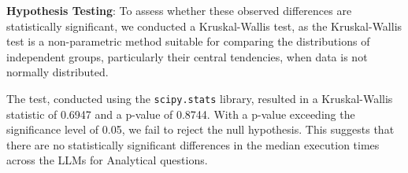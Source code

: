 \documentclass[conference]{IEEEtran}
\begin{document}

\textbf{Hypothesis Testing}: To assess whether these observed differences are statistically significant, we conducted a Kruskal-Wallis test, as the Kruskal-Wallis test is a non-parametric method suitable for comparing the distributions of independent groups, particularly their central tendencies, when data is not normally distributed. %


The test, conducted using the \texttt{scipy.stats} library, resulted in a Kruskal-Wallis statistic of 0.6947 and a p-value of 0.8744. With a p-value exceeding the significance level of 0.05, we fail to reject the null hypothesis. This suggests that there are no statistically significant differences in the median execution times across the LLMs for Analytical questions.
\end{document}

